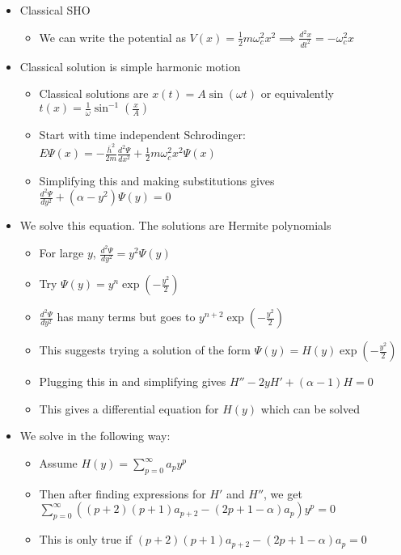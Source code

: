 \documentclass[12pt]{article}
\begin{document}
\begin{itemize}
    \item Classical SHO \begin{itemize}
        \item We can write the potential as $V(x) = \frac{1}{2} m \omega_c^2 x^2 \implies \frac{d^2 x}{dt^2} = - \omega_c^2 x$
    \end{itemize}
    \item Classical solution is simple harmonic motion \begin{itemize}
        \item Classical solutions are $x(t) = A \sin (\omega t)$ or equivalently $t(x) = \frac{1}{\omega} \sin^{-1} (\frac{x}{A})$
        \item Start with time independent Schrodinger: $E \varPsi(x) = - \frac{\bar{h}^2}{2m} \frac{d^2 \varPsi}{dx^2} + \frac{1}{2} m \omega_c^2 x^2 \varPsi(x)$
        \item Simplifying this and making substitutions gives $\frac{d^2 \varPsi}{dy^2} + (\alpha - y^2) \varPsi(y) = 0$
    \end{itemize}
    \item We solve this equation. The solutions are Hermite polynomials \begin{itemize}
        \item For large $y$, $\frac{d^2 \varPsi}{dy^2} = y^2 \varPsi(y)$
        \item Try $\varPsi(y) = y^n \exp (- \frac{y^2}{2})$
        \item $\frac{d^2 \varPsi}{dy^2}$ has many terms but goes to $y^{n+2} \exp (- \frac{y^2}{2})$
        \item This suggests trying a solution of the form $\varPsi(y) = H(y) \exp(-\frac{y^2}{2})$
        \item Plugging this in and simplifying gives $H'' - 2yH' + (\alpha -1 )H = 0$
        \item This gives a differential equation for $H(y)$ which can be solved 
    \end{itemize}
    \item We solve in the following way: \begin{itemize}
        \item Assume $H(y) = \sum_{p = 0}^{\infty} a_p y^p$
        \item Then after finding expressions for $H'$ and $H''$, we get $\sum_{p = 0}^{\infty} ((p+2)(p+1)a_{p+2} - (2p + 1 - \alpha)a_p)y^p = 0$
        \item This is only true if $(p+2)(p+1) a_{p+2} - (2p + 1 - \alpha) a_p = 0$

\end{itemize}
\end{itemize}
\end{document}
